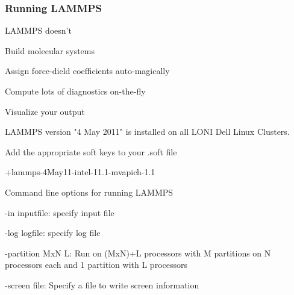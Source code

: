 \documentclass[slidestop,mathserif,compress,xcolor=svgnames]{beamer}
\begin{document}
\begin{frame}
  \frametitle{\small Running LAMMPS}
  \begin{itemize}
    {\footnotesize
    \item LAMMPS doesn't
    \begin{enumerate}
      {\footnotesize
      \item Build molecular systems
      \item Assign force-dield coefficients auto-magically
      \item Compute lots of diagnostics on-the-fly
      \item Visualize your output
      }
    \end{enumerate}
    \item LAMMPS version "4 May 2011" is installed on all LONI Dell Linux Clusters.%
    \item Add the appropriate soft keys to your .soft file
    \begin{enumerate}
      {\footnotesize
      \item[$\vardiamond$]  +lammps-4May11-intel-11.1-mvapich-1.1
      }
    \end{enumerate}
    \item Command line options for running LAMMPS
    \begin{itemize}
      {\footnotesize
      \item[$\vardiamond$] -in inputfile: specify input file
      \item[$\vardiamond$] -log logfile: specify log file
      \item[$\vardiamond$] -partition MxN L: Run on (MxN)+L processors with M partitions on N processors each and 1 partition with L processors
      \item[$\vardiamond$] -screen file: Specify a file to write screen information
      }
    \end{itemize}
    }
  \end{itemize}
\end{frame}
\end{document}
